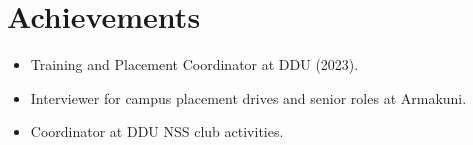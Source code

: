 \section{Achievements}

\begin{itemize}
  \item Training and Placement Coordinator at DDU (2023).
  \item Interviewer for campus placement drives and senior roles at Armakuni.
  \item Coordinator at DDU NSS club activities.
\end{itemize}

